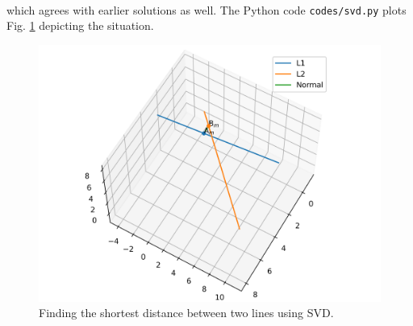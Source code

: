 \documentclass[journal,12pt,twocolumn]{IEEEtran}
\begin{document}
\begin{enumerate}
\begin{align}
    \end{align}
    which agrees with earlier solutions as well. The Python code
    \texttt{codes/svd.py} plots Fig. \ref{fig:svd} depicting the situation.
    \begin{figure}[!ht]
        \centering
        \includegraphics[width=\columnwidth]{figs/skew_svd.png}
        \caption{Finding the shortest distance between two lines using SVD.}
        \label{fig:svd}
    \end{figure}
\end{enumerate}
\end{document}

